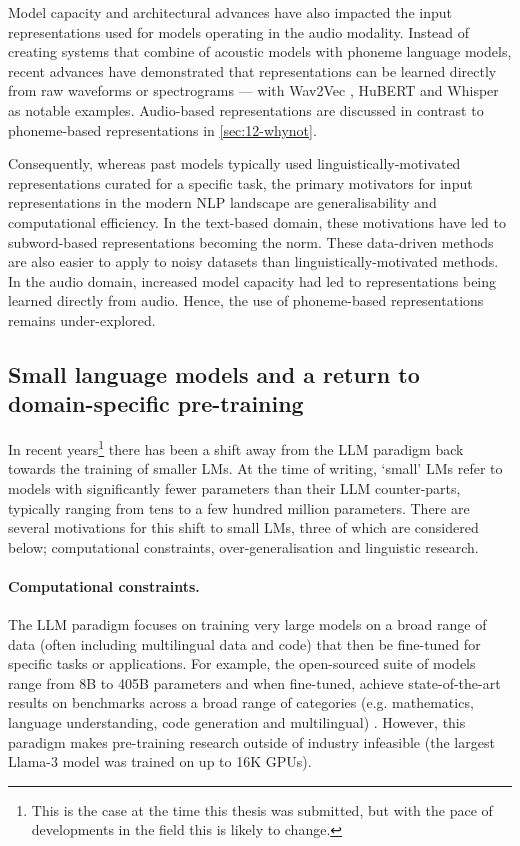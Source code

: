
Model capacity and architectural advances have also impacted the input representations used for models operating in the audio modality. Instead of creating systems that combine of acoustic models with phoneme language models, recent advances have demonstrated that representations can be learned directly from raw waveforms or spectrograms --- with Wav2Vec \citep{baevski2020wav2vec}, HuBERT \citep{hsu2021hubert} and Whisper \citep{radford2023robust} as notable examples. Audio-based representations are discussed in contrast to phoneme-based representations in \cref{sec:12-whynot}.

Consequently, whereas past models typically used linguistically-motivated representations curated for a specific task, the primary motivators for input representations in the modern NLP landscape are generalisability and computational efficiency. In the text-based domain, these motivations have led to subword-based representations becoming the norm. These data-driven methods are also easier to apply to noisy datasets than linguistically-motivated methods. In the audio domain, increased model capacity had led to representations being learned directly from audio. Hence, the use of phoneme-based representations remains under-explored. 

\subsection{Small language models and a return to domain-specific pre-training}\label{sec:12-domainspecific}

In recent years\footnote{This is the case at the time this thesis was submitted, but with the pace of developments in the field this is likely to change.} there has been a shift away from the LLM paradigm back towards the training of smaller LMs. At the time of writing, `small' LMs  refer to models with significantly fewer parameters than their LLM counter-parts, typically ranging from tens to a few hundred million parameters. There are several motivations for this shift to small LMs, three of which are considered below; computational constraints, over-generalisation and linguistic research.

\paragraph{Computational constraints.} The LLM paradigm focuses on training very large models on a broad range of data (often including multilingual data and code) that then be fine-tuned for specific tasks or applications. For example, the open-sourced  suite of models range from 8B to 405B parameters and when fine-tuned, achieve state-of-the-art results on benchmarks across a broad range of categories (e.g. mathematics, language understanding, code generation and multilingual) \citep{grattafiori2024llama}. However, this paradigm makes pre-training research outside of industry infeasible (the largest Llama-3 model was trained on up to 16K GPUs).


